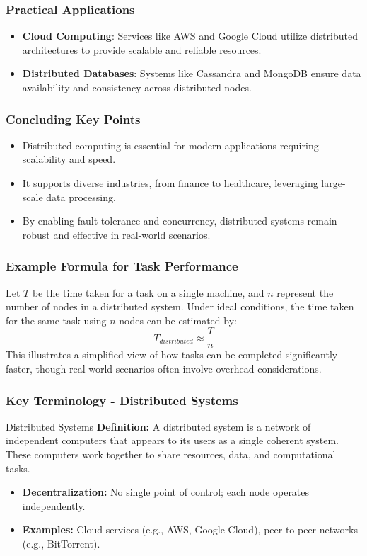\documentclass[aspectratio=169]{beamer}
\begin{document}
\begin{frame}[fragile]
    \frametitle{Practical Applications}
    \begin{itemize}
        \item \textbf{Cloud Computing}: Services like AWS and Google Cloud utilize distributed architectures to provide scalable and reliable resources.
        \item \textbf{Distributed Databases}: Systems like Cassandra and MongoDB ensure data availability and consistency across distributed nodes.
    \end{itemize}
\end{frame}

\begin{frame}[fragile]
    \frametitle{Concluding Key Points}
    \begin{itemize}
        \item Distributed computing is essential for modern applications requiring scalability and speed.
        \item It supports diverse industries, from finance to healthcare, leveraging large-scale data processing.
        \item By enabling fault tolerance and concurrency, distributed systems remain robust and effective in real-world scenarios.
    \end{itemize}
\end{frame}

\begin{frame}[fragile]
    \frametitle{Example Formula for Task Performance}
    Let \( T \) be the time taken for a task on a single machine, and \( n \) represent the number of nodes in a distributed system. 
    Under ideal conditions, the time taken for the same task using \( n \) nodes can be estimated by:
    \begin{equation}
        T_{distributed} \approx \frac{T}{n}
    \end{equation}
    This illustrates a simplified view of how tasks can be completed significantly faster, though real-world scenarios often involve overhead considerations.
\end{frame}

\begin{frame}[fragile]
    \frametitle{Key Terminology - Distributed Systems}
    \begin{block}{Distributed Systems}
        \textbf{Definition:}  
        A distributed system is a network of independent computers that appears to its users as a single coherent system. These computers work together to share resources, data, and computational tasks.
    \end{block}
    \begin{itemize}
        \item \textbf{Decentralization:} No single point of control; each node operates independently.
        \item \textbf{Examples:} Cloud services (e.g., AWS, Google Cloud), peer-to-peer networks (e.g., BitTorrent).
    \end{itemize}
\end{frame}
\end{document}
